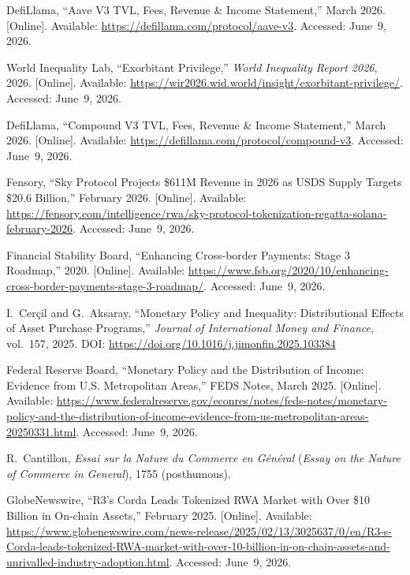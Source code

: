 \documentclass[12pt, a4paper]{report}
\begin{document}
{\begin{enumerate}[label={[\arabic*]}]
\item DefiLlama, ``Aave V3 TVL, Fees, Revenue \& Income Statement,'' March 2026. [Online]. Available: \url{https://defillama.com/protocol/aave-v3}. Accessed: June~9, 2026.

\item World Inequality Lab, ``Exorbitant Privilege,'' \textit{World Inequality Report 2026}, 2026. [Online]. Available: \url{https://wir2026.wid.world/insight/exorbitant-privilege/}. Accessed: June~9, 2026.

\item DefiLlama, ``Compound V3 TVL, Fees, Revenue \& Income Statement,'' March 2026. [Online]. Available: \url{https://defillama.com/protocol/compound-v3}. Accessed: June~9, 2026.

\item Fensory, ``Sky Protocol Projects \$611M Revenue in 2026 as USDS Supply Targets \$20.6 Billion,'' February 2026. [Online]. Available: \url{https://fensory.com/intelligence/rwa/sky-protocol-tokenization-regatta-solana-february-2026}. Accessed: June~9, 2026.

\item Financial Stability Board, ``Enhancing Cross-border Payments: Stage 3 Roadmap,'' 2020. [Online]. Available: \url{https://www.fsb.org/2020/10/enhancing-cross-border-payments-stage-3-roadmap/}. Accessed: June~9, 2026.

\item I.~Cer\c{c}il and G.~Aksaray, ``Monetary Policy and Inequality: Distributional Effects of Asset Purchase Programs,'' \textit{Journal of International Money and Finance}, vol.~157, 2025. DOI: \url{https://doi.org/10.1016/j.jimonfin.2025.103384}

\item Federal Reserve Board, ``Monetary Policy and the Distribution of Income: Evidence from U.S. Metropolitan Areas,'' FEDS Notes, March 2025. [Online]. Available: \url{https://www.federalreserve.gov/econres/notes/feds-notes/monetary-policy-and-the-distribution-of-income-evidence-from-us-metropolitan-areas-20250331.html}. Accessed: June~9, 2026.

\item R.~Cantillon, \textit{Essai sur la Nature du Commerce en G\'en\'eral} (\textit{Essay on the Nature of Commerce in General}), 1755 (posthumous).

\item GlobeNewswire, ``R3's Corda Leads Tokenized RWA Market with Over \$10 Billion in On-chain Assets,'' February 2025. [Online]. Available: \url{https://www.globenewswire.com/news-release/2025/02/13/3025637/0/en/R3-s-Corda-leads-tokenized-RWA-market-with-over-10-billion-in-on-chain-assets-and-unrivalled-industry-adoption.html}. Accessed: June~9, 2026.


\end{enumerate}}
\end{document}
